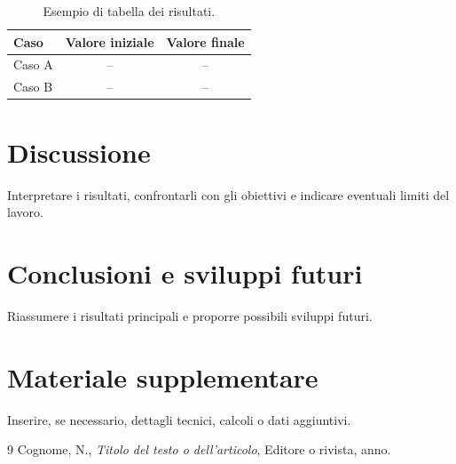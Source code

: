 \documentclass[12pt,a4paper,oneside]{report}
\begin{document}
\begin{table}[htbp]
    \centering
    \caption{Esempio di tabella dei risultati.}
    \label{tab:risultati}
    \begin{tabular}{lcc}
        \toprule
        Caso & Valore iniziale & Valore finale \\
        \midrule
        Caso A & -- & -- \\
        Caso B & -- & -- \\
        \bottomrule
    \end{tabular}
\end{table}

\chapter{Discussione}
Interpretare i risultati, confrontarli con gli obiettivi e indicare eventuali
limiti del lavoro.

\chapter{Conclusioni e sviluppi futuri}
Riassumere i risultati principali e proporre possibili sviluppi futuri.

\appendix
\chapter{Materiale supplementare}
Inserire, se necessario, dettagli tecnici, calcoli o dati aggiuntivi.

\begin{thebibliography}{9}
    Cognome, N., \emph{Titolo del testo o dell'articolo},
    Editore o rivista, anno.
\end{thebibliography}
\end{document}
